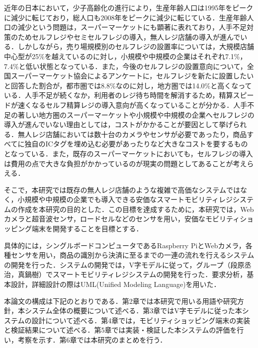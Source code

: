 



近年の日本において，少子高齢化の進行により，生産年齢人口は1995年をピークに減少に転じており，総人口も2008年をピークに減少に転じている\cite{population}．生産年齢人口の減少という問題は，スーパーマーケットにも顕著に表れており，人手不足対策のためセルフレジやセミセルフレジの導入，無人レジ店舗の導入が進んでいる．しかしながら，売り場規模別のセルフレジの設置率については，大規模店舗中心型が25\%を越えているのに対し，小規模や中規模の企業はそれぞれ7.1\%，7.4\%\cite{super}と低い状態となっている．また，今後のセルフレジの設置意向について，全国スーパーマーケット協会によるアンケートに，セルフレジを新たに設置したいと回答した割合が，都市圏では8.8\%なのに対し，地方圏では14.0\%\cite{super}と高くなっている．人手不足が続くなか，利用者のレジ待ち時間を解消するため，精算スピードが速くなるセルフ精算レジの導入意向が高くなっていることが分かる\cite{super}．人手不足の著しい地方圏のスーパーマーケットや小規模や中規模の企業へセルフレジの導入が進んでいない理由としては，コストがかかることが要因として挙げられる．無人レジ店舗においては数十台のカメラやセンサが必要であったり，商品すべてに独自のICタグを埋め込む必要があったりなど大きなコストを要するものとなっている．また，既存のスーパーマーケットにおいても，セルフレジの導入は費用の点で大きな負担がかかっているのが現実の問題としてあることが考えらえる．

そこで，本研究では既存の無人レジ店舗のような複雑で高価なシステムではなく，小規模や中規模の企業でも導入できる安価なスマートモビリティレジシステムの作成を本研究の目的とした．この目標を達成するために，本研究では，Webカメラと超音波センサ，ロードセルなどのセンサを用い，安価なモビリティショッピング端末を開発することを目標とする．

具体的には，シングルボードコンピュータであるRaspberry PiとWebカメラ，各種センサを用い，商品の識別から決済に至るまでの一連の流れを行えるシステムの開発を行った．システムの開発では，V字モデルに従って，グループ（段原丞治，真鍋樹）でスマートモビリティレジシステムの開発を行った．要求分析，基本設計，詳細設計の際はUML(Unified Modeling Language)を用いた．

本論文の構成は下記のとおりである．第2章では本研究で用いる用語や研究方針，本システム全体の概要について述べる．第3章ではV字モデルに従った本システムの設計について述べる．第4章では，モビリティショッピング端末の実装と検証結果について述べる．第5章では実装・検証した本システムの評価を行い，考察を示す．第6章では本研究のまとめを行う．